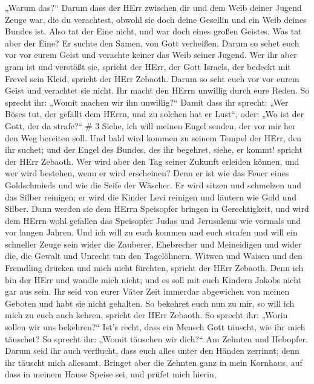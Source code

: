 „Warum das?{}`` Darum dass der HErr zwischen dir und dem Weib deiner
Jugend Zeuge war, die du verachtest, obwohl sie doch deine Gesellin und
ein Weib deines Bundes ist.  Also tat der Eine nicht, und
war doch eines großen Geistes. Was tat aber der Eine? Er suchte den
Samen, von Gott verheißen. Darum so sehet euch vor vor eurem Geist und
verachte keiner das Weib seiner Jugend.  Wer ihr aber gram
ist und verstößt sie, spricht der HErr, der Gott Israels, der bedeckt
mit Frevel sein Kleid, spricht der HErr Zebaoth. Darum so seht euch vor
vor eurem Geist und verachtet sie nicht.  Ihr macht den
HErrn unwillig durch eure Reden. So sprecht ihr: „Womit machen wir ihn
unwillig?{}`` Damit dass ihr sprecht: „Wer Böses tut, der gefällt dem
HErrn, und zu solchen hat er Lust``, oder: „Wo ist der Gott, der da
strafe?{}`` \# 3  Siehe, ich will meinen Engel senden, der
vor mir her den Weg bereiten soll. Und bald wird kommen zu seinem Tempel
der HErr, den ihr suchet; und der Engel des Bundes, des ihr begehret,
siehe, er kommt! spricht der HErr Zebaoth.  Wer wird aber
den Tag seiner Zukunft erleiden können, und wer wird bestehen, wenn er
wird erscheinen? Denn er ist wie das Feuer eines Goldschmieds und wie
die Seife der Wäscher.  Er wird sitzen und schmelzen und das
Silber reinigen; er wird die Kinder Levi reinigen und läutern wie Gold
und Silber. Dann werden sie dem HErrn Speisopfer bringen in
Gerechtigkeit,  und wird dem HErrn wohl gefallen das
Speisopfer Judas und Jerusalems wie vormals und vor langen Jahren.
 Und ich will zu euch kommen und euch strafen und will ein
schneller Zeuge sein wider die Zauberer, Ehebrecher und Meineidigen und
wider die, die Gewalt und Unrecht tun den Tagelöhnern, Witwen und Waisen
und den Fremdling drücken und mich nicht fürchten, spricht der HErr
Zebaoth.  Denn ich bin der HErr und wandle mich nicht; und
es soll mit euch Kindern Jakobs nicht gar aus sein.  Ihr
seid von eurer Väter Zeit immerdar abgewichen von meinen Geboten und
habt sie nicht gehalten. So bekehret euch nun zu mir, so will ich mich
zu euch auch kehren, spricht der HErr Zebaoth. So sprecht ihr: „Worin
sollen wir uns bekehren?{}``  Ist's recht, dass ein Mensch
Gott täuscht, wie ihr mich täuschet? So sprecht ihr: „Womit täuschen wir
dich?{}`` Am Zehnten und Hebopfer.  Darum seid ihr auch
verflucht, dass euch alles unter den Händen zerrinnt; denn ihr täuscht
mich allesamt.  Bringet aber die Zehnten ganz in mein
Kornhaus, auf dass in meinem Hause Speise sei, und prüfet mich hierin,
